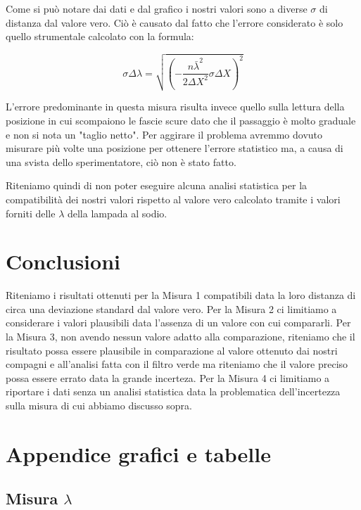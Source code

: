\documentclass{article}
\begin{document}
Come si può notare dai dati e dal grafico i nostri valori sono a diverse $\sigma$ di distanza dal valore vero. Ciò è causato dal fatto che l'errore considerato è solo quello strumentale calcolato con la formula:

\begin{equation} 
\sigma\Delta\lambda = \sqrt{ (- \frac{n {\bar \lambda}^2}{2 \Delta X^2} \sigma\Delta X)^2} 
\end{equation}

L'errore predominante in questa misura risulta invece quello sulla lettura della posizione in cui scompaiono le fascie scure dato che il passaggio è molto graduale e non si nota un "taglio netto".%
Per aggirare il problema avremmo dovuto misurare più volte una posizione per ottenere l'errore statistico ma, a causa di una svista dello sperimentatore, ciò non è stato fatto. 

Riteniamo quindi di non poter eseguire alcuna analisi statistica per la compatibilità dei nostri valori rispetto al valore vero calcolato tramite i valori forniti delle $\lambda$ della lampada al sodio.




\section{Conclusioni}
Riteniamo i risultati ottenuti per la Misura 1 compatibili data la loro distanza di circa una deviazione standard dal valore vero. Per la Misura 2 ci limitiamo a considerare i valori plausibili data l'assenza di un valore con cui compararli. Per la Misura 3, non avendo nessun valore adatto alla comparazione, riteniamo che il risultato possa essere plausibile in comparazione al valore ottenuto dai nostri compagni e all'analisi fatta con il filtro verde ma riteniamo che il valore preciso possa essere errato data la grande incerteza. Per la Misura 4 ci limitiamo a riportare i dati senza un analisi statistica data la problematica dell'incertezza sulla misura di cui abbiamo discusso sopra.




\section{Appendice grafici e tabelle}
\subsection{Misura $\lambda$}
\end{document}
